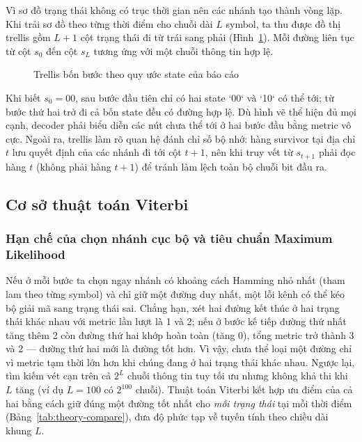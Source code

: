\documentclass[12pt,a4paper]{article}
\renewcommand{\_}{\originalunderscore\allowbreak}
\begin{document}
Vì sơ đồ trạng thái không có trục thời gian nên các nhánh tạo thành vòng lặp. Khi trải sơ đồ theo từng thời điểm cho chuỗi dài $L$ symbol, ta thu được đồ thị trellis gồm $L+1$ cột trạng thái đi từ trái sang phải (Hình~\ref{fig:theory-trellis}). Mỗi đường liên tục từ cột $s_0$ đến cột $s_L$ tương ứng với một chuỗi thông tin hợp lệ.

\begin{figure}[H]\centering
{}
\caption{Trellis bốn bước theo quy ước state của báo cáo}\label{fig:theory-trellis}
\end{figure}

Khi biết $s_0=00$, sau bước đầu tiên chỉ có hai state `00` và `10` có thể tới; từ bước thứ hai trở đi cả bốn state đều có đường hợp lệ. Dù hình vẽ thể hiện đủ mọi cạnh, decoder phải biểu diễn các nút chưa thể tới ở hai bước đầu bằng metric vô cực. Ngoài ra, trellis làm rõ quan hệ đánh chỉ số bộ nhớ: hàng survivor tại địa chỉ $t$ lưu quyết định của các nhánh đi tới cột $t+1$, nên khi truy vết từ $s_{t+1}$ phải đọc hàng $t$ (không phải hàng $t+1$) để tránh làm lệch toàn bộ chuỗi bit đầu ra.

\subsection{Cơ sở thuật toán Viterbi}

\subsubsection{Hạn chế của chọn nhánh cục bộ và tiêu chuẩn Maximum Likelihood}
Nếu ở mỗi bước ta chọn ngay nhánh có khoảng cách Hamming nhỏ nhất (tham lam theo từng symbol) và chỉ giữ một đường duy nhất, một lỗi kênh có thể kéo bộ giải mã sang trạng thái sai. Chẳng hạn, xét hai đường kết thúc ở hai trạng thái khác nhau với metric lần lượt là 1 và 2; nếu ở bước kế tiếp đường thứ nhất tăng thêm 2 còn đường thứ hai khớp hoàn toàn (tăng 0), tổng metric trở thành 3 và 2 — đường thứ hai mới là đường tốt hơn. Vì vậy, chưa thể loại một đường chỉ vì metric tạm thời lớn hơn khi chúng đang ở hai trạng thái khác nhau. Ngược lại, tìm kiếm vét cạn trên cả $2^L$ chuỗi thông tin tuy tối ưu nhưng không khả thi khi $L$ tăng (ví dụ $L=100$ có $2^{100}$ chuỗi). Thuật toán Viterbi kết hợp ưu điểm của cả hai bằng cách giữ đúng một đường tốt nhất cho \emph{mỗi trạng thái} tại mỗi thời điểm (Bảng~\ref{tab:theory-compare}), đưa độ phức tạp về tuyến tính theo chiều dài khung $L$.
\end{document}
